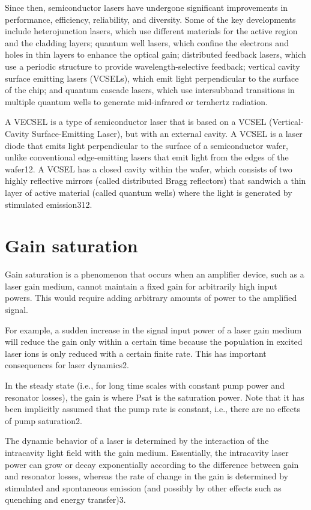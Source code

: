 Since then, semiconductor lasers have undergone significant improvements in performance, efficiency, reliability, and diversity. Some of the key developments include heterojunction lasers, which use different materials for the active region and the cladding layers; quantum well lasers, which confine the electrons and holes in thin layers to enhance the optical gain; distributed feedback lasers, which use a periodic structure to provide wavelength-selective feedback; vertical cavity surface emitting lasers (VCSELs), which emit light perpendicular to the surface of the chip; and quantum cascade lasers, which use intersubband transitions in multiple quantum wells to generate mid-infrared or terahertz radiation.

A VECSEL is a type of semiconductor laser that is based on a VCSEL (Vertical-Cavity Surface-Emitting Laser), but with an external cavity. A VCSEL is a laser diode that emits light perpendicular to the surface of a semiconductor wafer, unlike conventional edge-emitting lasers that emit light from the edges of the wafer12. A VCSEL has a closed cavity within the wafer, which consists of two highly reflective mirrors (called distributed Bragg reflectors) that sandwich a thin layer of active material (called quantum wells) where the light is generated by stimulated emission312.


\section{Gain saturation}

Gain saturation is a phenomenon that occurs when an amplifier device, such as a laser gain medium, cannot maintain a fixed gain for arbitrarily high input powers. This would require adding arbitrary amounts of power to the amplified signal.

For example, a sudden increase in the signal input power of a laser gain medium will reduce the gain only within a certain time because the population in excited laser ions is only reduced with a certain finite rate. This has important consequences for laser dynamics2.

In the steady state (i.e., for long time scales with constant pump power and resonator losses), the gain is where Psat is the saturation power. Note that it has been implicitly assumed that the pump rate is constant, i.e., there are no effects of pump saturation2.

The dynamic behavior of a laser is determined by the interaction of the intracavity light field with the gain medium. Essentially, the intracavity laser power can grow or decay exponentially according to the difference between gain and resonator losses, whereas the rate of change in the gain is determined by stimulated and spontaneous emission (and possibly by other effects such as quenching and energy transfer)3.

